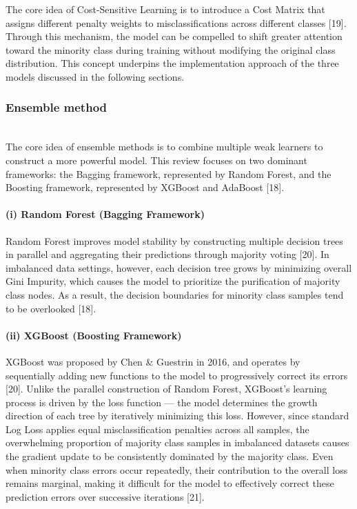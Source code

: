 \documentclass[sigconf]{acmart}
\begin{document}
The core idea of Cost-Sensitive Learning is to introduce a Cost Matrix that assigns different penalty weights to misclassifications across different classes [19]. Through this mechanism, the model can be compelled to shift greater attention toward the minority class during training without modifying the original class distribution. This concept underpins the implementation approach of the three models discussed in the following sections. 

\subsubsection{Ensemble method}~\\

The core idea of ensemble methods is to combine multiple weak learners to construct a more powerful model. This review focuses on two dominant frameworks: the Bagging framework, represented by Random Forest, and the Boosting framework, represented by XGBoost and AdaBoost [18]. 

\paragraph{(i) Random Forest (Bagging Framework)}

Random Forest improves model stability by constructing multiple decision trees in parallel and aggregating their predictions through majority voting [20]. In imbalanced data settings, however, each decision tree grows by minimizing overall Gini Impurity, which causes the model to prioritize the purification of majority class nodes. As a result, the decision boundaries for minority class samples tend to be overlooked [18].

\paragraph{(ii) XGBoost (Boosting Framework)}

XGBoost was proposed by Chen \& Guestrin in 2016, and operates by sequentially adding new functions to the model to progressively correct its errors [20]. Unlike the parallel construction of Random Forest, XGBoost's learning process is driven by the loss function — the model determines the growth direction of each tree by iteratively minimizing this loss. However, since standard Log Loss applies equal misclassification penalties across all samples, the overwhelming proportion of majority class samples in imbalanced datasets causes the gradient update to be consistently dominated by the majority class. Even when minority class errors occur repeatedly, their contribution to the overall loss remains marginal, making it difficult for the model to effectively correct these prediction errors over successive iterations [21]. 
\end{document}
